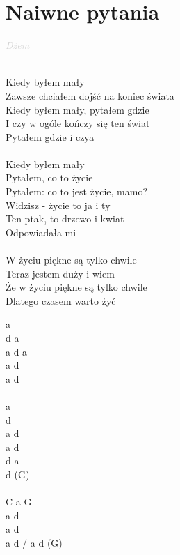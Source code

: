 \documentclass[a5paper, 10pt]{book}
\begin{document}
\section{Naiwne pytania}\textcolor{lightgray}{\textit{Dżem}}\\~\\
\begin{minipage}[t]{0.8\textwidth}
Kiedy byłem mały\\
Zawsze chciałem dojść na koniec świata\\
Kiedy byłem mały, pytałem gdzie\\
I czy w ogóle kończy się ten świat\\
Pytałem gdzie i czya\\
\\
Kiedy byłem mały\\
Pytałem, co to życie\\
Pytałem: co to jest życie, mamo?\\
Widzisz - życie to ja i ty\\
Ten ptak, to drzewo i kwiat\\
Odpowiadała mi\\
\\
\hspace*{5mm}W życiu piękne są tylko chwile\\

Teraz jestem duży i wiem\\
Że w życiu piękne są tylko chwile\\
Dlatego czasem warto żyć\\
\end{minipage}
\begin{minipage}[t]{0.2\textwidth}
a\\
d a\\
a d a\\
a d\\
a d\\
\\
a\\
d\\
a d\\
a d\\
d a\\
d (G)\\
\\
C a G\\

a d\\
a d\\
a d / a d (G)\\
\end{minipage}
\end{document}
